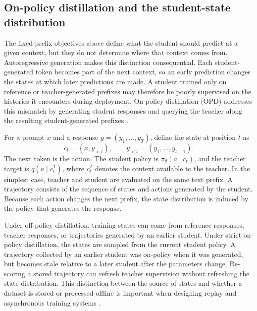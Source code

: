 \subsection{On-policy distillation and the student-state distribution}
\label{subsec:distillation-on-policy}

The fixed-prefix objectives above define what the student should predict at
a given context, but they do not determine where that context comes from.
Autoregressive generation makes this distinction consequential.  Each
student-generated token becomes part of the next context, so an early
prediction changes the states at which later predictions are made.  A student
trained only on reference or teacher-generated prefixes may therefore be
poorly supervised on the histories it encounters during deployment.  On-policy
distillation (OPD) addresses this mismatch by generating student responses
and querying the teacher along the resulting student-generated prefixes
\parencite{Song2026OnPolicyDistillation}.

For a prompt \(x\) and a response \(y=(y_1,\ldots,y_T)\), define the
state at position \(t\) as
\begin{equation}
    c_t=(x,y_{<t}),
    \qquad y_{<t}=(y_1,\ldots,y_{t-1}).
    \label{eq:distillation-opd-state}
\end{equation}
The next token is the action.  The student policy is
\(\pi_\theta(a\mid c_t)\), and the teacher target is
\(q(a\mid c_t^T)\), where \(c_t^T\) denotes the context available to
the teacher.  In the simplest case, teacher and student are evaluated on
the same text prefix.  A trajectory consists of the sequence of states and
actions generated by the student.  Because each action changes the next
prefix, the state distribution is induced by the policy that generates the
response.

Under off-policy distillation, training states can come from reference
responses, teacher responses, or trajectories generated by an earlier
student.  Under strict on-policy distillation, the states are sampled from
the current student policy.  A trajectory collected by an earlier student
was on-policy when it was generated, but becomes stale relative to a later
student after the parameters change.  Re-scoring a stored trajectory can
refresh teacher supervision without refreshing the state distribution.
This distinction between the source of states and whether a dataset is stored
or processed offline is important when designing replay and asynchronous
training systems \parencite{Song2026OnPolicyDistillation}.

